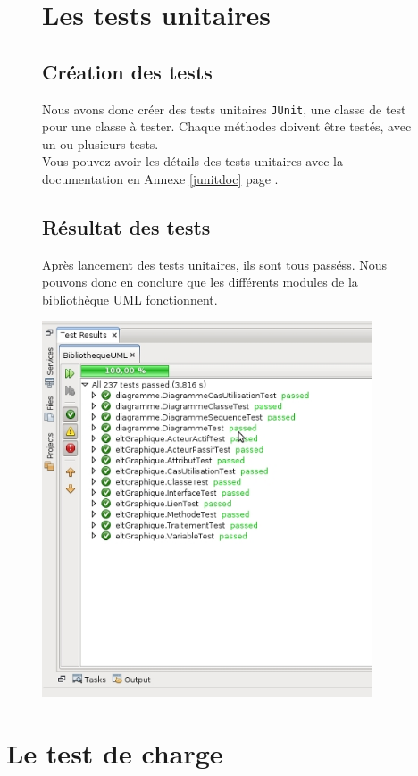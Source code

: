\documentclass[12pt,a4paper,openany]{report}
\begin{document}
			\begin{figure}[H]
				\section{Les tests unitaires}
				\subsection{Création des tests}
				\begin{flushleft}
					Nous avons donc créer des tests unitaires \texttt{JUnit}, une classe de test pour une classe à tester. Chaque méthodes doivent être testés, 
					avec un ou plusieurs tests.\\
					Vous pouvez avoir les détails des tests unitaires avec la documentation en Annexe \ref{junitdoc} page \pageref{junitdoc}.
				\subsection{Résultat des tests}
				Après lancement des tests unitaires, ils sont tous passéss. Nous pouvons donc en conclure que les différents modules de la bibliothèque UML fonctionnent. 
				\end{flushleft}
				\centering
				\includegraphics[width=9.75cm]{junitPassed.jpg} 
			\end{figure}
			\newpage
	\section{Le test de charge}
\end{document}
